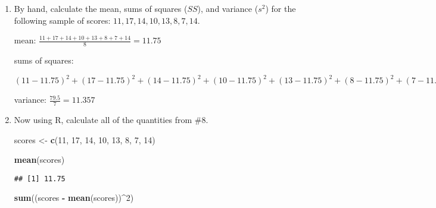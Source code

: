 \documentclass[]{article}
\newenvironment{Shaded}{\begin{snugshade}}{\end{snugshade}}
\newcommand{\KeywordTok}[1]{\textcolor[rgb]{0.13,0.29,0.53}{\textbf{#1}}}
\newcommand{\DecValTok}[1]{\textcolor[rgb]{0.00,0.00,0.81}{#1}}
\newcommand{\StringTok}[1]{\textcolor[rgb]{0.31,0.60,0.02}{#1}}
\newcommand{\OperatorTok}[1]{\textcolor[rgb]{0.81,0.36,0.00}{\textbf{#1}}}
\newcommand{\NormalTok}[1]{#1}
\begin{document}
\begin{enumerate}
\begin{enumerate}
\begin{verbatim}
## [1] 12
\end{verbatim}
  \item
    Which measure of central tendency in part \emph{b} changed the most,
    compared to the values in part \emph{a}? Why?

    \emph{The one-year-old dog was an outlier in the dataset. None of
    the other dogs lived less than 8 years. Removing this value affected
    the mean most of all, because it is sensitive to outliers. The
    median was also impacted because the removed value happened to be
    the minimum value. This change was not as dramatic.}
  \end{enumerate}
\item
  By hand, calculate the mean, sums of squares (\(SS\)), and variance
  (\(s^2\)) for the following sample of scores:
  \(11, 17, 14, 10, 13, 8, 7, 14\).

  mean: \(\frac{11 + 17 + 14 + 10 + 13 + 8 + 7 + 14}{8} = 11.75\)

  sums of squares:

  \((11 - 11.75)^2 + (17 - 11.75)^2 + (14 - 11.75)^2 + (10 - 11.75)^2 + (13 - 11.75)^2 + (8 - 11.75)^2 + (7 - 11.75)^2 + (14 - 11.75)^2 = 79.5\)

  variance: \(\frac{79.5}{7} = 11.357\)
\item
  Now using R, calculate all of the quantities from \#8.

\begin{Shaded}
\begin{Highlighting}[]
\NormalTok{scores <-}\StringTok{ }\KeywordTok{c}\NormalTok{(}\DecValTok{11}\NormalTok{, }\DecValTok{17}\NormalTok{, }\DecValTok{14}\NormalTok{, }\DecValTok{10}\NormalTok{, }\DecValTok{13}\NormalTok{, }\DecValTok{8}\NormalTok{, }\DecValTok{7}\NormalTok{, }\DecValTok{14}\NormalTok{)}
\end{Highlighting}
\end{Shaded}

\begin{Shaded}
\begin{Highlighting}[]
\KeywordTok{mean}\NormalTok{(scores)}
\end{Highlighting}
\end{Shaded}

\begin{verbatim}
## [1] 11.75
\end{verbatim}

\begin{Shaded}
\begin{Highlighting}[]
\KeywordTok{sum}\NormalTok{((scores }\OperatorTok{-}\StringTok{ }\KeywordTok{mean}\NormalTok{(scores))}\OperatorTok{^}\DecValTok{2}\NormalTok{)}
\end{Highlighting}
\end{Shaded}


\end{enumerate}
\end{document}
